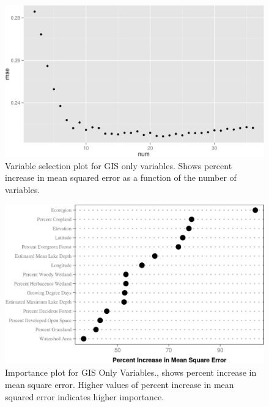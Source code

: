 \documentclass[11pt,]{article}
\begin{document}
\newpage

\begin{figure}[htbp]
\centering
\includegraphics{manuscript_files/figure-latex/gis_var_sel_figure-1.jpeg}
\caption{Variable selection plot for GIS only variables. Shows percent
increase in mean squared error as a function of the number of variables.
\label{fig:gis_varsel_figure}}
\end{figure}

\newpage

\begin{figure}[htbp]
\centering
\includegraphics{manuscript_files/figure-latex/GIS_Importance-1.jpeg}
\caption{Importance plot for GIS Only Variables., shows percent increase
in mean square error. Higher values of percent increase in mean squared
error indicates higher importance. \label{fig:GIS_Importance}}
\end{figure}

\newpage
\end{document}
